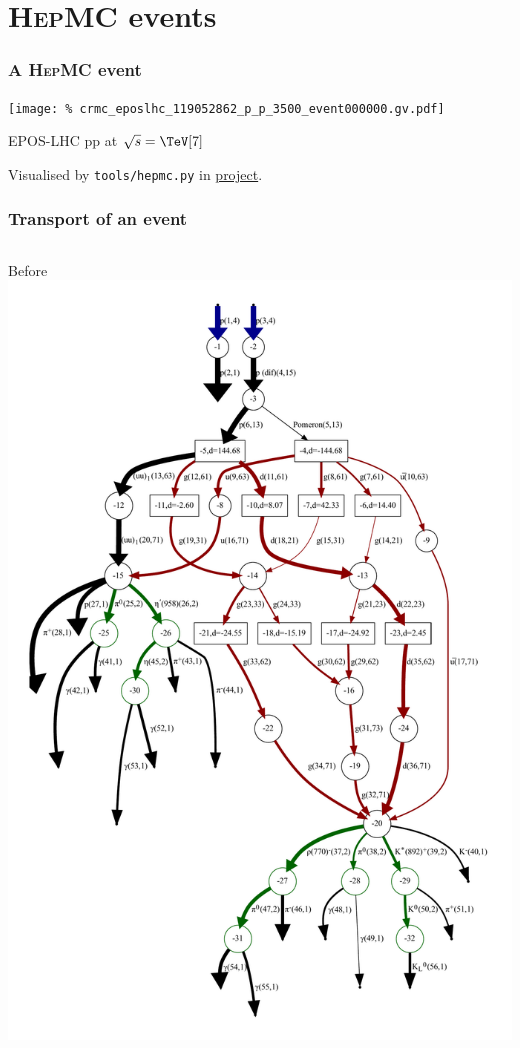 \documentclass[compress,table,8pt]{beamer}
\newcommand\HepMC{{\scshape HepMC}}
\begin{document}
\section{\HepMC{} events}
\begin{frame}
  \frametitle{A \HepMC{} event}
  \begin{center}
    \texttt{[image: \%
      crmc\_eposlhc\_119052862\_p\_p\_3500\_event000000.gv.pdf]}
  \end{center}
  EPOS-LHC pp at $\sqrt{s}=\TeV[7]$

  {\footnotesize Visualised by \texttt{tools/hepmc.py} in
    \href{https://gitlab.com/cholmcc/O2Rivet}{project}.}
\end{frame}

\begin{frame}
  \frametitle{Transport of an event}
  \begin{columns}[t,onlytextwidth]
    \begin{column}{.2\linewidth}
      \begin{block}{Before}
        \includegraphics[width=\linewidth]{genpythia_event000000.gv.pdf}

\end{block}
\end{column}
\end{columns}
\end{frame}
\end{document}
